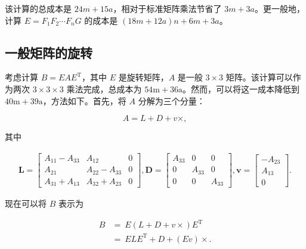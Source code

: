 \documentclass[10pt,a4paper]{book}
\theoremstyle{thmstyle} %
\theoremstyle{defstyle} %
\theoremstyle{prostyle} %
\begin{document}
该计算的总成本是 $24m + 15a$，相对于标准矩阵乘法节省了 $3m + 3a$。更一般地，计算 $E = F_1F_2 \cdots F_nG$ 的成本是 $(18m + 12a)n + 6m + 3a$。



\subsection{一般矩阵的旋转}





考虑计算 $B = EAE^{\mathrm{T}}$，其中 $E$ 是旋转矩阵，$A$ 是一般 $3 \times 3$ 矩阵。该计算可以作为两次 $3 \times 3 \times 3$ 乘法完成，总成本为 $54\mathrm{m} + 36\mathrm{a}$。然而，可以将这一成本降低到 $40\mathrm{m} + 39\mathrm{a}$，方法如下。首先，将 $A$ 分解为三个分量：



$$
A = L + D + v × ,
$$



其中



$$
\begin{array}{r} { \boldsymbol { L } = \left[ \begin{array}{lll} { A _ { 11 } - A _ { 33 } } & { A _ { 12 } } & { 0 } \\{ A _ { 21 } } & { A _ { 22 } - A _ { 33 } } & { 0 } \\{ A _ { 31 } + A _ { 13 } } & { A _ { 32 } + A _ { 23 } } & { 0 } \end{array} \right] ,  \boldsymbol { D } = \left[ \begin{array}{lll} { A _ { 33 } } & { 0 } & { 0 } \\{ 0 } & { A _ { 33 } } & { 0 } \\{ 0 } & { 0 } & { A _ { 33 } } \end{array} \right] ,  \boldsymbol { v } = \left[ \begin{array}{l} { - A _ { 23 } } \\{ A _ { 13 } } \\{ 0 } \end{array} \right] . } \end{array}
$$



现在可以将 $B$ 表示为



$$
\begin{array}{rl} { B } & { = \ E \left( L + D + v \times \right) E ^{\mathrm { T} } } \\& { = \ E L E ^{\mathrm { T} } + D + ( E v ) \times . } \end{array}
$$
\end{document}
